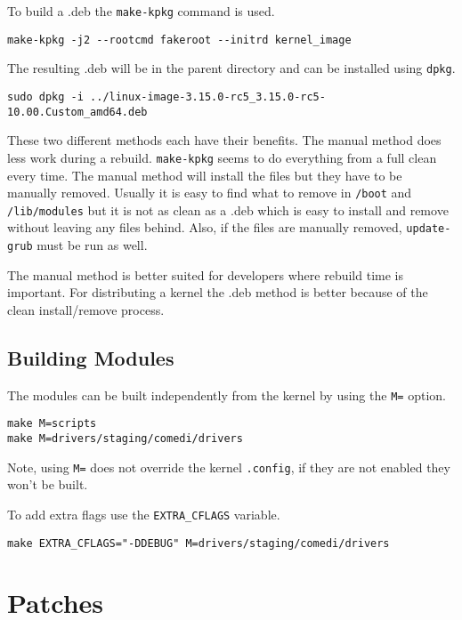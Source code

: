 \documentclass{article}
\begin{document}
To build a .deb the \verb+make-kpkg+ command is used.

\begin{verbatim}
make-kpkg -j2 --rootcmd fakeroot --initrd kernel_image
\end{verbatim}

The resulting .deb will be in the parent directory and can be installed
using \verb+dpkg+.

\begin{verbatim}
sudo dpkg -i ../linux-image-3.15.0-rc5_3.15.0-rc5-10.00.Custom_amd64.deb
\end{verbatim}

These two different methods each have their benefits.  The manual method
does less work during a rebuild.  \verb+make-kpkg+ seems to do everything
from a full clean every time.  The manual method will install the files
but they have to be manually removed.  Usually it is easy to find what
to remove in \verb+/boot+ and \verb+/lib/modules+ but it is not as clean as a .deb
which is easy to install and remove without leaving any files behind.
Also, if the files are manually removed, \verb+update-grub+ must be run as
well.

The manual method is better suited for developers where rebuild time is
important.  For distributing a kernel the .deb method is better because
of the clean install/remove process.

\subsection{Building Modules}

The modules can be built independently from the kernel by using the \verb+M=+
option.

\begin{verbatim}
make M=scripts
make M=drivers/staging/comedi/drivers
\end{verbatim}

Note, using \verb+M=+ does not override the kernel \verb+.config+, if they are not
enabled they won't be built.

To add extra flags use the \verb+EXTRA_CFLAGS+ variable.

\begin{verbatim}
make EXTRA_CFLAGS="-DDEBUG" M=drivers/staging/comedi/drivers
\end{verbatim}

\section{Patches}
\end{document}
